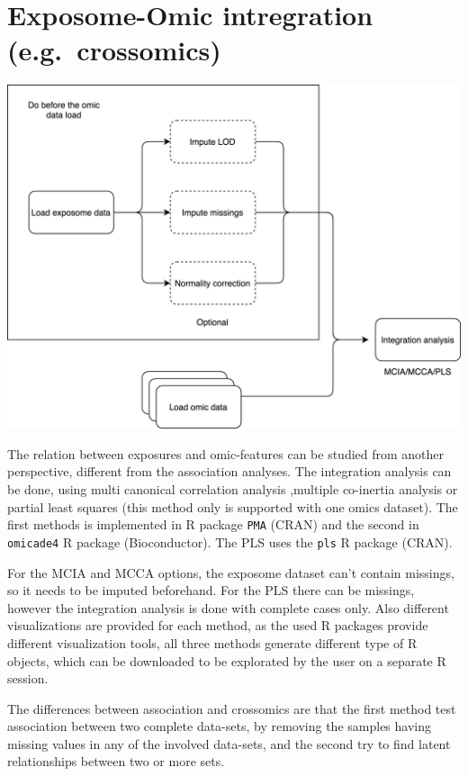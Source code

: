 \documentclass[
]{book}
\begin{document}
\hypertarget{exposome-omic-intregration-e.g.-crossomics}{%
\section{Exposome-Omic intregration (e.g.~crossomics)}\label{exposome-omic-intregration-e.g.-crossomics}}

\includegraphics{images/analysis12.png}

The relation between exposures and omic-features can be studied from another perspective, different from the association analyses. The integration analysis can be done, using multi canonical correlation analysis ,multiple co-inertia analysis or partial least squares (this method only is supported with one omics dataset). The first methods is implemented in R package \texttt{PMA} (CRAN) and the second in \texttt{omicade4} R package (Bioconductor). The PLS uses the \texttt{pls} R package (CRAN).

For the MCIA and MCCA options, the exposome dataset can't contain missings, so it needs to be imputed beforehand. For the PLS there can be missings, however the integration analysis is done with complete cases only. Also different visualizations are provided for each method, as the used R packages provide different visualization tools, all three methods generate different type of R objects, which can be downloaded to be explorated by the user on a separate R session.

The differences between association and crossomics are that the first method test association between two complete data-sets, by removing the samples having missing values in any of the involved data-sets, and the second try to find latent relationships between two or more sets.
\end{document}
